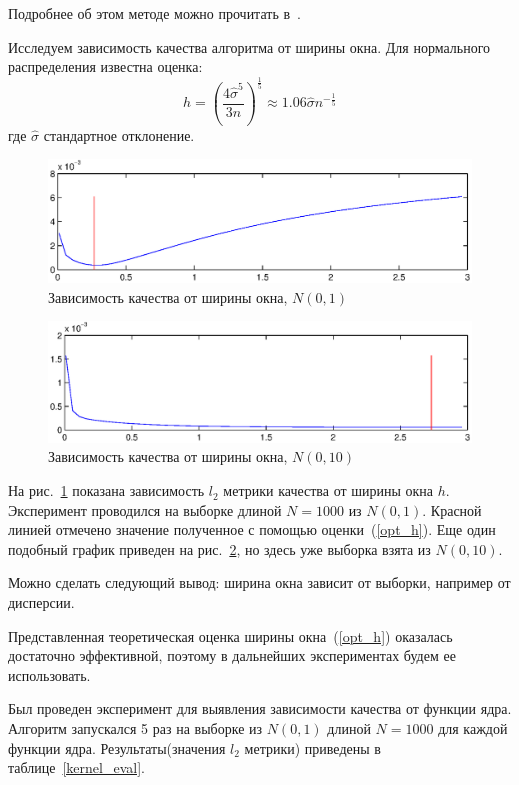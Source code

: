 \documentclass[10pt, a4paper]{article}
\begin{document}
Подробнее об этом методе можно прочитать в~\cite[\S~2.2]{voron}.

Исследуем зависимость качества алгоритма от ширины окна.
Для нормального распределения известна оценка:
\begin{equation}
    h=\left(\frac{4\hat \sigma^5}{3n}\right)^{\frac{1}{5}}\approx 1.06\hat \sigma n^{-\frac{1}{5}}
    \label{opt_h}
\end{equation}
где $\hat \sigma$ стандартное отклонение.

\begin{figure}[h]
    \includegraphics[width=\textwidth]{h_eval.eps}
    \caption{Зависимость качества от ширины окна, $N(0,1)$}
    \label{h_eval}
\end{figure}
\begin{figure}[h]
    \includegraphics[width=\textwidth]{h_sigma10.eps}
    \caption{Зависимость качества от ширины окна, $N(0,10)$}
    \label{h_sigma10}
\end{figure}

На рис.~\ref{h_eval} показана зависимость $l_2$ метрики качества от ширины окна $h$. Эксперимент проводился на
выборке длиной $N=1000$ из $N(0,1)$. Красной линией отмечено значение полученное с помощью оценки~(\ref{opt_h}).
Еще один подобный график приведен на рис.~\ref{h_sigma10}, но здесь уже выборка взята из $N(0,10)$.

Можно сделать следующий вывод: ширина окна зависит от выборки, например от дисперсии.

Представленная теоретическая оценка ширины окна~(\ref{opt_h}) оказалась достаточно эффективной, поэтому в дальнейших
экспериментах будем ее использовать.

Был проведен эксперимент для выявления зависимости качества от функции ядра.
Алгоритм запускался 5 раз на выборке из $N(0,1)$ длиной $N=1000$ для каждой функции ядра. 
Результаты(значения $l_2$ метрики) приведены в таблице~\ref{kernel_eval}.
\end{document}
